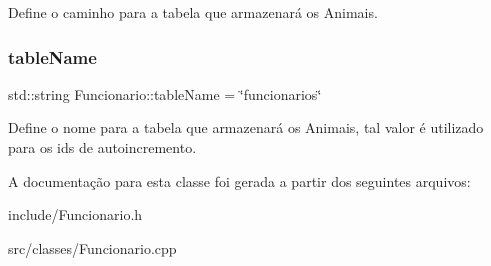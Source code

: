 Define o caminho para a tabela que armazenará os Animais. \mbox{\label{classFuncionario_a6c10ac916f8b0435bea51c240ca0df34}} 
\subsubsection{\texorpdfstring{table\+Name}{tableName}}
{\footnotesize\ttfamily std\+::string Funcionario\+::table\+Name = \char`\"{}funcionarios\char`\"{}\hspace{0.3cm}{\ttfamily [static]}}

Define o nome para a tabela que armazenará os Animais, tal valor é utilizado para os ids de autoincremento. 

A documentação para esta classe foi gerada a partir dos seguintes arquivos\+:\begin{DoxyCompactItemize}
\item 
include/Funcionario.\+h\item 
src/classes/Funcionario.\+cpp\end{DoxyCompactItemize}
